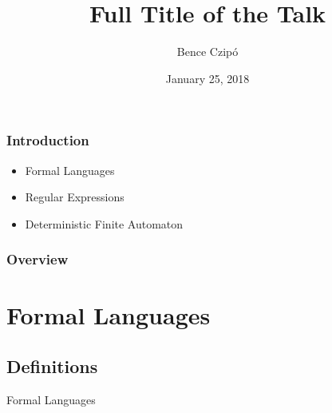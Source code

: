 \documentclass{beamer}
\title[Semester project]{Full Title of the Talk} %
\author{Bence Czipó} %
\institute[] %
{
École Polytechnique Fédérale de Lausanne \\ %
\medskip
\textit{bence.czipo@epfl.ch} %
}
\date{January 25, 2018} %
\begin{document}
\begin{frame}
\titlepage %
\end{frame}


\begin{frame}
\frametitle{Introduction}

\begin{itemize}
	\item Formal Languages
	\item Regular Expressions
	\item Deterministic Finite Automaton
\end{itemize}

\end{frame}

\begin{frame}
\frametitle{Overview} %
\tableofcontents %
\end{frame}


\section{Formal Languages}
\subsection{Definitions}

\begin{frame}
	\Huge{\centerline{Formal Languages}}
\end{frame}
\end{document}
